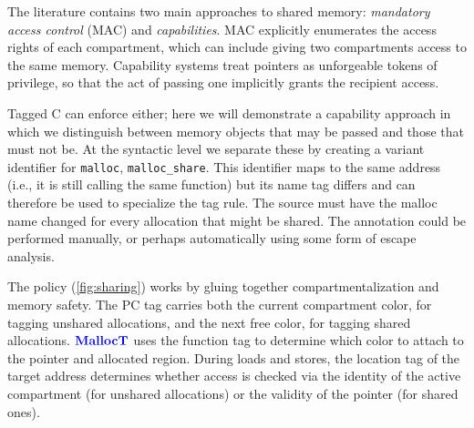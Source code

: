 \documentclass{llncs}
\begin{document}
\begin{table}[t]
The literature contains two main approaches to shared memory:
{\em mandatory access control} (MAC) and {\em capabilities}.
MAC explicitly
enumerates the access rights of each compartment, which can include giving two
compartments access to the same memory. Capability systems treat
pointers as unforgeable tokens of privilege, so that the act of passing one
implicitly grants the recipient access.

Tagged C can enforce either; here we will demonstrate a capability approach
in which we distinguish between memory objects that may be passed and those that must not be.
At the syntactic level we separate these by creating a variant identifier for {\tt malloc},
{\tt malloc\_share}. This identifier maps to the same address (i.e., it is still calling the same function)
but its name tag differs and can therefore be used to specialize the tag rule. The source
must have the malloc name changed for every allocation that might be shared.
The annotation could be performed manually, or perhaps automatically using some form
of escape analysis.

The policy (\cref{fig:sharing}) works by gluing together compartmentalization and memory safety.
The PC tag carries both the current compartment color, for tagging unshared allocations, and the next free color, for tagging shared allocations.
\(\color{blue} \mathbf{MallocT}\) uses the function tag to determine which color to attach to the pointer and allocated
region. During loads and stores, the location tag of the target address
determines whether access is checked via the identity of the active compartment (for unshared allocations) or
the validity of the pointer (for shared ones).





\end{table}
\end{document}
